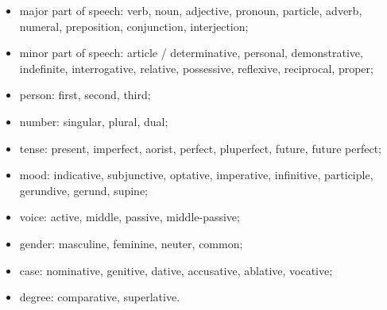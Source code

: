 \begin{itemize}
\item major part of speech: verb, noun, adjective, pronoun, particle,
  adverb, numeral, preposition, conjunction, interjection;
\item minor part of speech: article / determinative, personal,
  demonstrative, indefinite, interrogative, relative, possessive,
  reflexive, reciprocal, proper;
\item person: first, second, third;
\item number: singular, plural, dual;
\item tense: present, imperfect, aorist, perfect, pluperfect,
  future, future perfect;
\item mood: indicative, subjunctive, optative, imperative,
  infinitive, participle, gerundive, gerund, supine;
\item voice: active, middle, passive, middle-passive;
\item gender: masculine, feminine, neuter, common;
\item case: nominative, genitive, dative, accusative, ablative,
  vocative;
\item degree: comparative, superlative.
\end{itemize}

